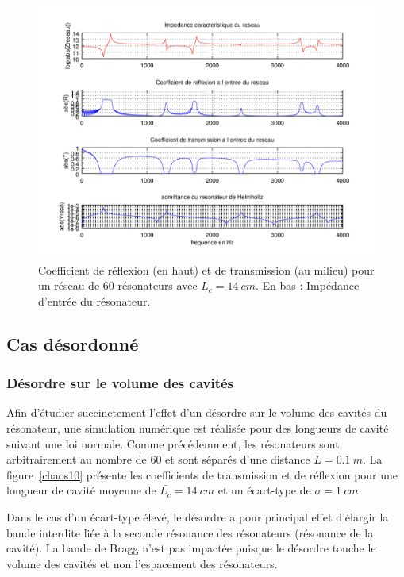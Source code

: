 \begin{figure}
\centering
\includegraphics[scale=0.7]{./images_chp1/ex_coef_rapport.png}
\caption{\label{ex_coef_RT} Coefficient de réflexion (en haut) et de transmission (au milieu) pour un réseau de 60 résonateurs avec $L_c=14~cm$. En bas : Impédance d'entrée du résonateur.}
\end{figure}

\subsection{Cas désordonné}

\subsubsection{Désordre sur le volume des cavités}

Afin d'étudier succinctement l'effet d'un désordre sur le volume des cavités du résonateur, une simulation numérique est réalisée pour des longueurs de cavité suivant une loi normale. Comme précédemment, les résonateurs sont arbitrairement au nombre de 60 et sont séparés d'une distance $L=0.1~m$. La figure~\ref{chaos10} présente les coefficients de transmission et de réflexion pour une longueur de cavité moyenne de $\bar{L_c}=14~cm$ et un écart-type  de $\sigma = 1~cm$.


Dans le cas d'un écart-type élevé, le désordre a pour principal effet d'élargir la bande interdite liée à la seconde résonance des résonateurs (résonance de la cavité). La bande de Bragg n'est pas impactée puisque le désordre touche le volume des cavités et non l'espacement des résonateurs.

